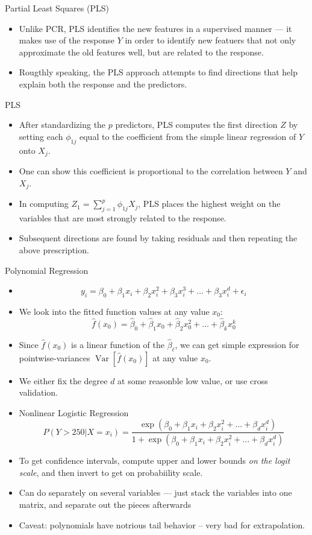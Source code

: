 \documentclass[11pt, a4paper]{article}
\begin{document}
Partial Least Squares (PLS)
\begin{itemize}
\item Unlike PCR, PLS identifies the new features in a supervised manner --- it makes use of the response $Y$ in order to identify new featuers that not only approximate the old features well, but are related to the response.
\item Rougthly speaking, the PLS approach attempts to find directions that help explain both the response and the predictors.
\end{itemize}
PLS
\begin{itemize}
  \item After standardizing the $p$ predictors, PLS computes the first direction $Z$ by setting each $\phi_{1j}$ equal to the coefficient from the simple linear regression of $Y$ onto $X_j$.
  \item One can show this coefficient is proportional to the correlation between $Y$ and $X_j$.
  \item In computing $Z_1=\sum^p_{j=1}\phi_{1j}X_j$, PLS places the highest weight on the variables that are most strongly related to the response.
  \item Subsequent directions are found by taking residuals and then repeating the above prescription.
\end{itemize}
Polynomial Regression
\begin{itemize}
  \item \[
y_i=\beta_0+\beta_1x_i+\beta_2x_i^2+\beta_3x_i^3+\dots+\beta_3x_i^d+\epsilon_i
\]
\item We look into the fitted function values at any value $x_0$:
  \[
    \hat{f}(x_0)=\hat{\beta}_0+\hat{\beta}_1x_0+\hat{\beta}_2x_0^2+\dots+\hat{\beta}_kx_0^k
  \]
\item Since $\hat{f}(x_0)$ is a linear function of the $\hat{\beta}_\ell$, we can get simple expression for pointwise-variances $\operatorname{Var}[\hat{f}(x_0)]$ at any value $x_0$.
\item We either fix the degree $d$ at some reasonble low value, or use cross validation.
\item Nonlinear Logistic Regression
  \[
    P(Y>250|X=x_i) = \frac{\exp(\beta_0+\beta_1x_i+\beta_2x_i^2+\dots+\beta_dx_i^d)}{1+\exp(\beta_0+\beta_1x_i+\beta_2x_i^2+\dots+\beta_dx_i^d)}
  \]
\item To get confidence intervals, compute upper and lower bounds \emph{on the logit scale}, and then invert to get on probabiility scale.
\item Can do separately on several variables --- just stack the variables into one matrix, and separate out the pieces afterwards
\item Caveat: polynomials have notrious tail behavior -- very bad for extrapolation.
\end{itemize}
\end{document}
